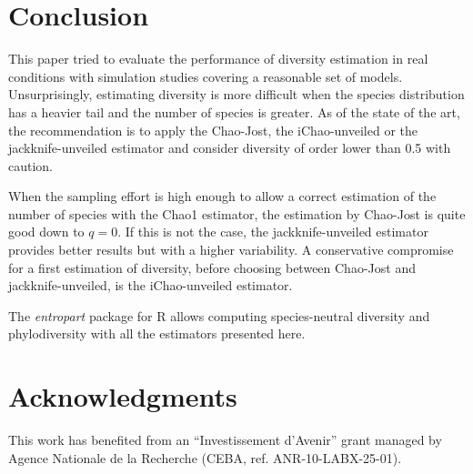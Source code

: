 \documentclass[fleqn,10pt]{latex/stylish_article} %
\begin{document}
\hypertarget{conclusion}{%
\section{Conclusion}\label{conclusion}}

This paper tried to evaluate the performance of diversity estimation in real conditions with simulation studies covering a reasonable set of models.
Unsurprisingly, estimating diversity is more difficult when the species distribution has a heavier tail and the number of species is greater.
As of the state of the art, the recommendation is to apply the Chao-Jost, the iChao-unveiled or the jackknife-unveiled estimator and consider diversity of order lower than 0.5 with caution.

When the sampling effort is high enough to allow a correct estimation of the number of species with the Chao1 estimator, the estimation by Chao-Jost is quite good down to \(q=0\).
If this is not the case, the jackknife-unveiled estimator provides better results but with a higher variability.
A conservative compromise for a first estimation of diversity, before choosing between Chao-Jost and jackknife-unveiled, is the iChao-unveiled estimator.

The \emph{entropart} package for R allows computing species-neutral diversity and phylodiversity with all the estimators presented here.

\hypertarget{acknowledgments}{%
\section{Acknowledgments}\label{acknowledgments}}

This work has benefited from an ``Investissement d'Avenir'' grant managed by Agence Nationale de la Recherche (CEBA, ref. ANR-10-LABX-25-01).



\makeatletter

\makeatother


\end{document}
